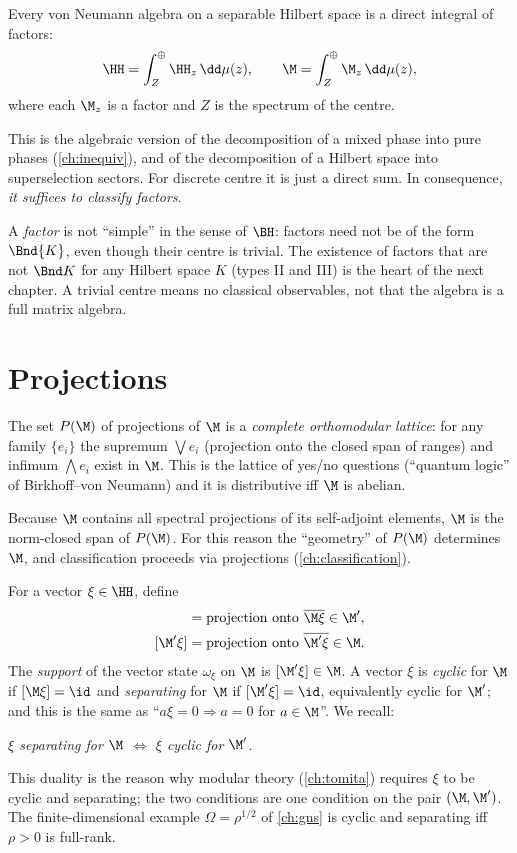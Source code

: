 \begin{theorem}
Every von Neumann algebra on a separable Hilbert space is a direct integral of factors:
\begin{equation}
\HH=\int^\oplus_Z\HH_z\,\dd\mu(z),\qquad\M=\int^\oplus_Z\M_z\,\dd\mu(z),
\end{equation}
where each $\M_z$ is a factor and $Z$ is the spectrum of the centre.
\end{theorem}
This is the algebraic version of the decomposition of a mixed phase into pure phases (\cref{ch:inequiv}), and of the decomposition of a Hilbert space into superselection sectors. For discrete centre it is just a direct sum. In consequence, \emph{it suffices to classify factors}.

\begin{whatwrong}
A \emph{factor} is not ``simple'' in the sense of $\BH$: factors need not be of the form $\Bnd{K}$, even though their centre is trivial. The existence of factors that are not $\Bnd K$ for any Hilbert space $K$ (types II and III) is the heart of the next chapter. A trivial centre means no classical observables, not that the algebra is a full matrix algebra.
\end{whatwrong}

\section{Projections}

The set $P(\M)$ of projections of $\M$ is a \emph{complete orthomodular lattice}: for any family $\{e_i\}$ the supremum $\bigvee e_i$ (projection onto the closed span of ranges) and infimum $\bigwedge e_i$ exist in $\M$. This is the lattice of yes/no questions (``quantum logic'' of Birkhoff--von Neumann) and it is distributive iff $\M$ is abelian.

Because $\M$ contains all spectral projections of its self-adjoint elements, $\M$ is the norm-closed span of $P(\M)$. For this reason the ``geometry'' of $P(\M)$ determines $\M$, and classification proceeds via projections (\cref{ch:classification}).

For a vector $\xi\in\HH$, define
\begin{align}
[\M\xi]&=\text{projection onto }\overline{\M\xi}\in\M',\\
[\M'\xi]&=\text{projection onto }\overline{\M'\xi}\in\M.
\end{align}
The \emph{support} of the vector state $\omega_\xi$ on $\M$ is $[\M'\xi]\in\M$. A vector $\xi$ is \emph{cyclic} for $\M$ if $[\M\xi]=\id$ and \emph{separating} for $\M$ if $[\M'\xi]=\id$, equivalently cyclic for $\M'$; and this is the same as ``$a\xi=0\Rightarrow a=0$ for $a\in\M$''. We recall:
\begin{center}
\emph{$\xi$ separating for $\M$ $\Longleftrightarrow$ $\xi$ cyclic for $\M'$.}
\end{center}
This duality is the reason why modular theory (\cref{ch:tomita}) requires $\xi$ to be cyclic and separating; the two conditions are one condition on the pair $(\M,\M')$. The finite-dimensional example $\Omega=\rho^{1/2}$ of \cref{ch:gns} is cyclic and separating iff $\rho>0$ is full-rank.

